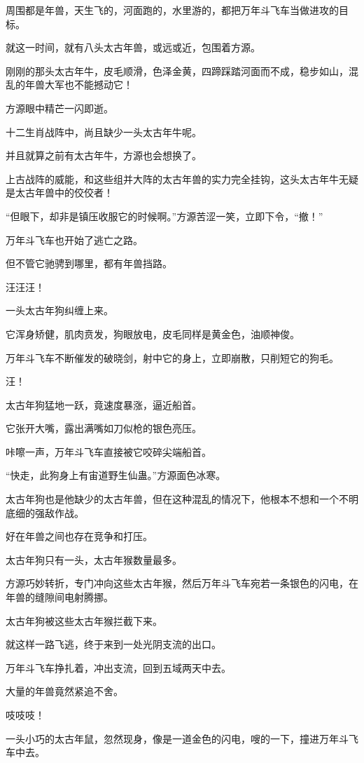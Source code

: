 \begin{this_body}
周围都是年兽，天生飞的，河面跑的，水里游的，都把万年斗飞车当做进攻的目标。

就这一时间，就有八头太古年兽，或远或近，包围着方源。

刚刚的那头太古年牛，皮毛顺滑，色泽金黄，四蹄踩踏河面而不成，稳步如山，混乱的年兽大军也不能撼动它！

方源眼中精芒一闪即逝。

十二生肖战阵中，尚且缺少一头太古年牛呢。

并且就算之前有太古年牛，方源也会想换了。

上古战阵的威能，和这些组并大阵的太古年兽的实力完全挂钩，这头太古年牛无疑是太古年兽中的佼佼者！

“但眼下，却非是镇压收服它的时候啊。”方源苦涩一笑，立即下令，“撤！”

万年斗飞车也开始了逃亡之路。

但不管它驰骋到哪里，都有年兽挡路。

汪汪汪！

一头太古年狗纠缠上来。

它浑身矫健，肌肉贲发，狗眼放电，皮毛同样是黄金色，油顺神俊。

万年斗飞车不断催发的破晓剑，射中它的身上，立即崩散，只削短它的狗毛。

汪！

太古年狗猛地一跃，竟速度暴涨，逼近船首。

它张开大嘴，露出满嘴如刀似枪的银色亮压。

咔嚓一声，万年斗飞车直接被它咬碎尖端船首。

“快走，此狗身上有宙道野生仙蛊。”方源面色冰寒。

太古年狗也是他缺少的太古年兽，但在这种混乱的情况下，他根本不想和一个不明底细的强敌作战。

好在年兽之间也存在竞争和打压。

太古年狗只有一头，太古年猴数量最多。

方源巧妙转折，专门冲向这些太古年猴，然后万年斗飞车宛若一条银色的闪电，在年兽的缝隙间电射腾挪。

太古年狗被这些太古年猴拦截下来。

就这样一路飞逃，终于来到一处光阴支流的出口。

万年斗飞车挣扎着，冲出支流，回到五域两天中去。

大量的年兽竟然紧追不舍。

吱吱吱！

一头小巧的太古年鼠，忽然现身，像是一道金色的闪电，嗖的一下，撞进万年斗飞车中去。


\end{this_body}
